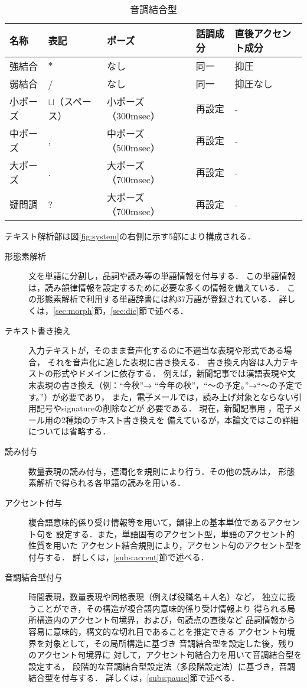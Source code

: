 \begin{table}[thb]
\caption{音調結合型}
\label{tab:oncyo}
\begin{center}
\begin{tabular}{l|l|l|l|l}\hline
名称	& 表記	  & ポーズ& 話調成分	& 直後アクセント成分 \\ \hline
強結合	& $\ast$  & なし & 同一	& 抑圧 \\
弱結合	& /	  & なし & 同一  & 抑圧なし  \\
小ポーズ & $\sqcup$（スペース）& 小ポーズ（300msec）	& 再設定& - \\
中ポーズ & ,	& 中ポーズ（500msec） & 再設定 & -  \\
大ポーズ & .	& 大ポーズ（700msec） & 再設定 & -  \\ 
疑問調\footnotemark   & ?	& 大ポーズ（700msec） & 再設定 & - \\ \hline
\end{tabular}
\end{center}
\end{table}


テキスト解析部は図\ref{fig:system}の右側に示す5部により構成される．
\begin{description}
\item[形態素解析]
文を単語に分割し，品詞や読み等の単語情報を付与する．
この単語情報は，読み韻律情報を設定するために必要な多くの情報を備えている．
この形態素解析で利用する単語辞書には約37万語が登録されている．
詳しくは，\ref{sec:morph}節，\ref{sec:dic}節で述べる．
\item[テキスト書き換え]
入力テキストが，そのまま音声化するのに不適当な表現や形式である場合，
それを音声化に適した表現に書き換える．
書き換え内容は入力テキストの形式やドメインに依存する．
例えば，新聞記事では漢語表現や文末表現の書き換え（例：``今秋''→
``今年の秋''，``〜の予定。''→``〜の予定です。''）が必要であり，
また，電子メールでは，読み上げ対象とならない引用記号やsignatureの削除などが
必要である．
現在，新聞記事用
\cite{Matsuoka}，電子メール用の2種類のテキスト書き換えを
備えているが，本論文ではこの詳細については省略する．
\item[読み付与]
数量表現の読み付与，連濁化を規則により行う．その他の読みは，
形態素解析で得られる各単語の読みを用いる．
\item[アクセント付与]
複合語意味的係り受け情報等を用いて，韻律上の基本単位であるアクセント句を
設定する．また，単語固有のアクセント型，単語のアクセント的性質を用いた
アクセント結合規則により，アクセント句のアクセント型を付与する．
詳しくは，\ref{subs:accent}節で述べる．
\item[音調結合型付与]
時間表現，数量表現や同格表現（例えば役職名＋人名）など，
独立に扱うことができ，その構造が複合語内意味的係り受け情報より
得られる局所構造内のアクセント句境界，および，句読点の直後など
品詞情報から容易に意味的，構文的な切れ目であることを推定できる
アクセント句境界を対象として，その局所構造に基づき
音調結合型を設定した後，残りのアクセント句境界に
対して，アクセント句結合力を用いて音調結合型を設定する，
段階的な音調結合型設定法（多段階設定法）に基づき，音調結合型を付与する．
詳しくは，\ref{subs:pause}節で述べる．
\end{description}

